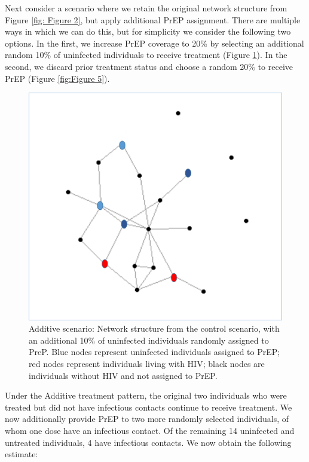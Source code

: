 \documentclass{article}
\theoremstyle{definition}
\begin{document}
Next consider a scenario where we retain the original network structure from Figure \ref{fig: Figure 2}, but apply additional PrEP assignment. There are multiple ways in which we can do this, but for simplicity we consider the following two options. In the first, we increase PrEP coverage to 20\% by selecting an additional random 10\% of uninfected individuals to receive treatment (Figure \ref{fig: Figure 4}). In the second, we discard prior treatment status and choose a random 20\% to receive PrEP (Figure \ref{fig:Figure 5}).


\begin{figure}[H]
    \centering
    \includegraphics[scale=0.5]{Original Figures/Network Example 4.png}
    \caption{Additive scenario: Network structure from the control scenario, with an additional 10\%  of uninfected individuals randomly assigned to PreP. Blue nodes represent uninfected individuals assigned to PrEP; red nodes represent individuals living with HIV; black nodes are individuals without HIV and not assigned to PrEP.}
    \label{fig: Figure 4}
\end{figure}

Under the Additive treatment pattern, the original two individuals who were treated but did not have infectious contacts continue to receive treatment. We now additionally provide PrEP to two more randomly selected individuals, of whom one dose have an infectious contact. Of the remaining 14 uninfected and untreated individuals, 4 have infectious contacts. We now obtain the following estimate: 
\end{document}
